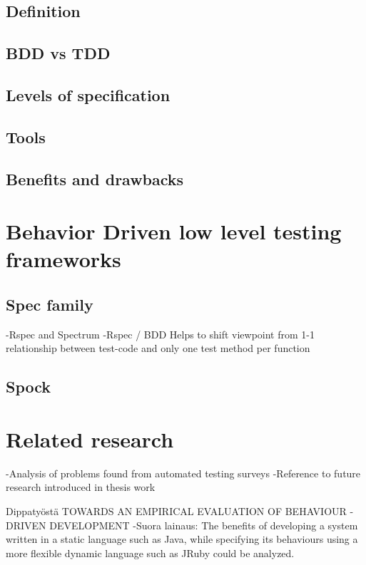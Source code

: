     \subsection{Definition}
    \subsection{BDD vs TDD}
    \subsection{Levels of specification}
    \subsection{Tools}
    \subsection{Benefits and drawbacks}
\section{Behavior Driven low level testing frameworks} %
    \subsection{Spec family}
            -Rspec and Spectrum\newline
            -Rspec / BDD Helps to shift viewpoint from 1-1 relationship between test-code and only one test method per function
    \subsection{Spock}
\section{Related research} %
    -Analysis of problems found from automated testing surveys\newline
    -Reference to future research introduced in thesis work\newline

    Dippatyöstä TOWARDS AN EMPIRICAL EVALUATION
                OF BEHAVIOUR - DRIVEN DEVELOPMENT\newline
    -Suora lainaus: The benefits of developing a system written in a static language such as Java, while specifying its
     behaviours using a more flexible dynamic language such as JRuby could be analyzed.\newline\newline

